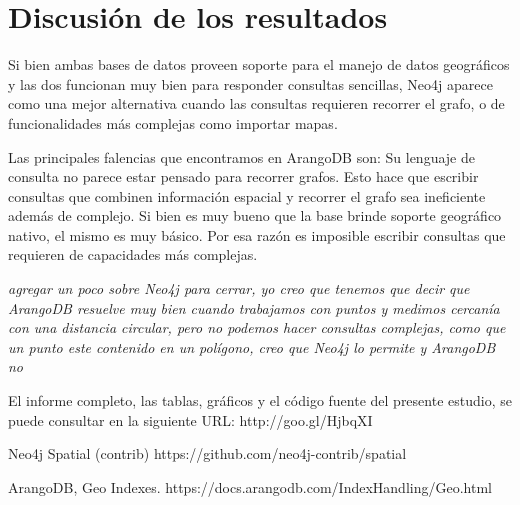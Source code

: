 \documentclass{llncs}
\begin{document}
\section{Discusión de los resultados}

Si bien ambas bases de datos proveen soporte para el manejo de datos geográficos y las dos funcionan muy bien para responder consultas sencillas, Neo4j aparece como una mejor alternativa cuando las consultas requieren recorrer el grafo, o de funcionalidades más complejas como importar mapas.

Las principales falencias que encontramos en ArangoDB son:
Su lenguaje de consulta no parece estar pensado para recorrer grafos. Esto hace que escribir consultas que combinen información espacial y recorrer el grafo sea ineficiente además de complejo.
Si bien es muy bueno que la base brinde soporte geográfico nativo, el mismo es muy básico. Por esa razón es imposible escribir consultas que requieren de capacidades más complejas.

\textit{agregar un poco sobre Neo4j para cerrar, yo creo que tenemos que decir que ArangoDB resuelve muy bien cuando trabajamos con puntos y medimos cercanía con una distancia circular, pero no podemos hacer consultas complejas, como que un punto este contenido en un polígono, creo que Neo4j lo permite y ArangoDB no}

El informe completo, las tablas, gráficos y el código fuente del presente estudio, se puede consultar en la siguiente URL: http://goo.gl/HjbqXI

%
%
\begin{thebibliography}{5}
%
Neo4j Spatial (contrib)
https://github.com/neo4j-contrib/spatial

ArangoDB, Geo Indexes.
https://docs.arangodb.com/IndexHandling/Geo.html

\end{thebibliography}
\end{document}
